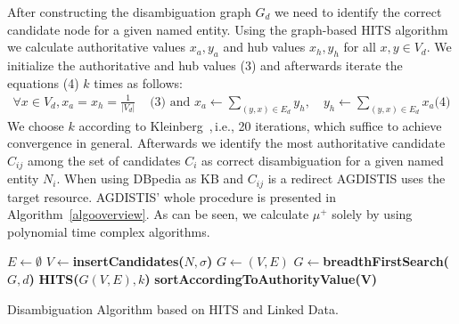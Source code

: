 After constructing the disambiguation graph $G_d$ we need to identify the correct candidate node for a given named entity.
Using the graph-based  \ac{HITS} algorithm we calculate authoritative values $x_a,y_a$ and hub values $x_h,y_h$ for all $x,y\in V_d$.
We initialize the authoritative and hub values (3) and afterwards iterate the equations (4) $k$ times as follows: 
\begin{align*}
\forall x \in V_d, x_a=x_h=\frac{1}{|V_d|} &\text{ (3) and } 
x_a\longleftarrow  \sum_{(y,x)\in E_d} y_h, \quad
y_h\longleftarrow \sum_{(y,x)\in E_d} x_a \text{(4)}
\end{align*}
We choose $k$ according to Kleinberg~\cite{HITS},\,i.e., 20 iterations, which suffice to achieve convergence in general. %
Afterwards we identify the most authoritative candidate $C_{ij}$ among the set of candidates $C_i$ as correct disambiguation for a given named entity $N_i$. %
When using DBpedia as \ac{KB} and $C_{ij}$ is a redirect AGDISTIS uses the target resource. %
AGDISTIS' whole procedure is presented in Algorithm~\ref{algooverview}.
As can be seen, we calculate $\mu^{+}$ solely by using polynomial time complex algorithms.
\begin{algorithm}
$E \longleftarrow \emptyset$\;
$V \longleftarrow${\bf insertCandidates($N, \sigma$)}\;
$G \longleftarrow (V,E)$\;
$G \longleftarrow${\bf breadthFirstSearch($G,d$)}\;
{\bf  \ac{HITS}($G(V,E), k$)}\;
{\bf sortAccordingToAuthorityValue(V)}\;
 {
}
\caption{Disambiguation Algorithm based on  \ac{HITS} and Linked Data.}\label{algooverview}
\end{algorithm}


